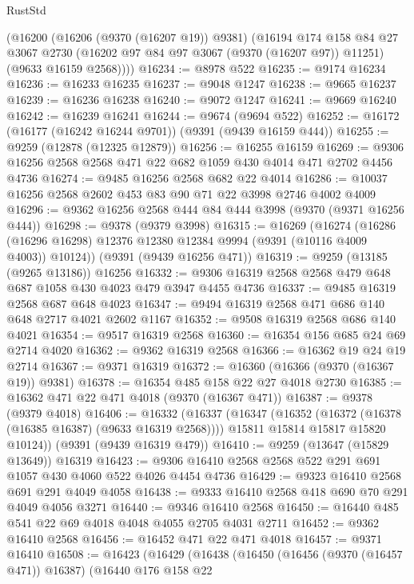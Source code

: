 \begin{lexlean}{RustStd}
\begin{coremodule}
      (@16200
        (@16206 (@9370 (@16207 @19)) @9381)
        (@16194
          @174
          @158
          @84
          @27
          @3067
          @2730
          (@16202 @97 @84 @97 @3067 (@9370 (@16207 @97)) @11251)
          (@9633 @16159 @2568))))
@16234 := @8978 @522
@16235 := @9174 @16234
@16236 := @16233 @16235
@16237 := @9048 @1247
@16238 := @9665 @16237
@16239 := @16236 @16238
@16240 := @9072 @1247
@16241 := @9669 @16240
@16242 := @16239 @16241
@16244 := @9674 (@9694 @522)
@16252 := @16172 (@16177 (@16242 @16244 @9701)) (@9391 (@9439 @16159 @444))
@16255 := @9259 (@12878 (@12325 @12879))
@16256 := @16255 @16159
@16269 := @9306 @16256 @2568 @2568 @471 @22 @682 @1059 @430 @4014 @471 @2702 @4456 @4736
@16274 := @9485 @16256 @2568 @682 @22 @4014
@16286 := @10037 @16256 @2568 @2602 @453 @83 @90 @71 @22 @3998 @2746 @4002 @4009
@16296 := @9362 @16256 @2568 @444 @84 @444 @3998 (@9370 (@9371 @16256 @444))
@16298 := @9378 (@9379 @3998)
@16315 := @16269
    (@16274 (@16286 (@16296 @16298) @12376 @12380 @12384 @9994 (@9391 (@10116 @4009 @4003)) @10124))
    (@9391 (@9439 @16256 @471))
@16319 := @9259 (@13185 (@9265 @13186)) @16256
@16332 := @9306 @16319 @2568 @2568 @479 @648 @687 @1058 @430 @4023 @479 @3947 @4455 @4736
@16337 := @9485 @16319 @2568 @687 @648 @4023
@16347 := @9494 @16319 @2568 @471 @686 @140 @648 @2717 @4021 @2602 @1167
@16352 := @9508 @16319 @2568 @686 @140 @4021
@16354 := @9517 @16319 @2568
@16360 := @16354 @156 @685 @24 @69 @2714 @4020
@16362 := @9362 @16319 @2568
@16366 := @16362 @19 @24 @19 @2714
@16367 := @9371 @16319
@16372 := @16360 (@16366 (@9370 (@16367 @19)) @9381)
@16378 := @16354 @485 @158 @22 @27 @4018 @2730
@16385 := @16362 @471 @22 @471 @4018 (@9370 (@16367 @471))
@16387 := @9378 (@9379 @4018)
@16406 := @16332
    (@16337
      (@16347
        (@16352 (@16372 (@16378 (@16385 @16387) (@9633 @16319 @2568))))
        @15811
        @15814
        @15817
        @15820
        @10124))
    (@9391 (@9439 @16319 @479))
@16410 := @9259 (@13647 (@15829 @13649)) @16319
@16423 := @9306 @16410 @2568 @2568 @522 @291 @691 @1057 @430 @4060 @522 @4026 @4454 @4736
@16429 := @9323 @16410 @2568 @691 @291 @4049 @4058
@16438 := @9333 @16410 @2568 @418 @690 @70 @291 @4049 @4056 @3271
@16440 := @9346 @16410 @2568
@16450 := @16440 @485 @541 @22 @69 @4018 @4048 @4055 @2705 @4031 @2711
@16452 := @9362 @16410 @2568
@16456 := @16452 @471 @22 @471 @4018
@16457 := @9371 @16410
@16508 := @16423
    (@16429
      (@16438
        (@16450
          (@16456 (@9370 (@16457 @471)) @16387)
          (@16440
            @176
            @158
            @22

\end{coremodule}
\end{lexlean}
